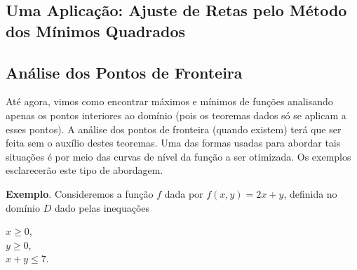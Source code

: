 	\subsection{Uma Aplicação: Ajuste de Retas pelo Método dos Mínimos Quadrados \cite{morettin}}
	
	\subsection{Análise dos Pontos de Fronteira \cite{morettin}}

		Até agora, vimos como encontrar máximos e mínimos de funções analisando apenas os pontos interiores ao domínio (pois os teoremas dados só se aplicam a esses pontos). A análise dos pontos de fronteira (quando existem) terá que ser feita sem o auxílio destes teoremas. Uma das formas usadas para abordar tais situações é por meio das curvas de nível da função a ser otimizada. Os exemplos esclarecerão este tipo de abordagem.

		\bigskip

		\textbf{Exemplo}. Consideremos a função $f$ dada por $f(x, y) = 2x + y$, definida no domínio $D$ dado pelas inequações

		\medskip

		$x \geq 0$, \\
		$y \geq 0$, \\
		$x + y \leq 7$.

